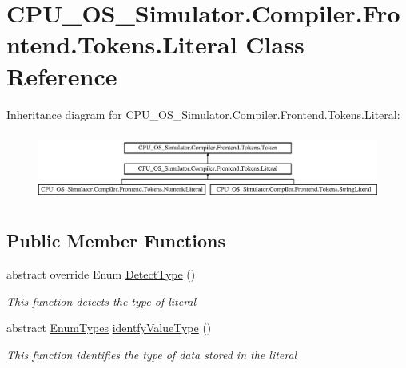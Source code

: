\hypertarget{class_c_p_u___o_s___simulator_1_1_compiler_1_1_frontend_1_1_tokens_1_1_literal}{}\section{C\+P\+U\+\_\+\+O\+S\+\_\+\+Simulator.\+Compiler.\+Frontend.\+Tokens.\+Literal Class Reference}
\label{class_c_p_u___o_s___simulator_1_1_compiler_1_1_frontend_1_1_tokens_1_1_literal}
Inheritance diagram for C\+P\+U\+\_\+\+O\+S\+\_\+\+Simulator.\+Compiler.\+Frontend.\+Tokens.\+Literal\+:\begin{figure}[H]
\begin{center}
\leavevmode
\includegraphics[height=2.282609cm]{class_c_p_u___o_s___simulator_1_1_compiler_1_1_frontend_1_1_tokens_1_1_literal}
\end{center}
\end{figure}
\subsection*{Public Member Functions}
\begin{DoxyCompactItemize}
\item 
abstract override Enum \hyperlink{class_c_p_u___o_s___simulator_1_1_compiler_1_1_frontend_1_1_tokens_1_1_literal_af449c5fee28fb2076933cdfc67857c23}{Detect\+Type} ()
\begin{DoxyCompactList}\small\item\em This function detects the type of literal \end{DoxyCompactList}\item 
abstract \hyperlink{namespace_c_p_u___o_s___simulator_1_1_compiler_1_1_frontend_1_1_tokens_a7c0cc43763cc9d01c7d5af34d70b96ea}{Enum\+Types} \hyperlink{class_c_p_u___o_s___simulator_1_1_compiler_1_1_frontend_1_1_tokens_1_1_literal_a34d05c00ded660daf66f91bd2543d186}{identfy\+Value\+Type} ()
\begin{DoxyCompactList}\small\item\em This function identifies the type of data stored in the literal \end{DoxyCompactList}\end{DoxyCompactItemize}
